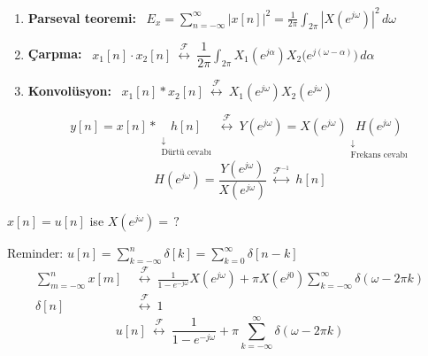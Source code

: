 \documentclass[11pt,a4paper]{article}
\begin{document}
\begin{enumerate}[label=\arabic*)]
  \item \textbf{Parseval teoremi:} \ $E_x=\displaystyle\sum_{n=-\infty}^{\infty}|x[n]|^2=\frac{1}{2\pi}\int_{2\pi}|X(e^{j\omega})|^2\,d\omega$
  \item \textbf{Çarpma:} \ $x_1[n]\cdot x_2[n]\ \overset{\mathcal{F}}{\longleftrightarrow}\ \dfrac{1}{2\pi}\displaystyle\int_{2\pi}X_1(e^{j\alpha})X_2\bigl(e^{j(\omega-\alpha)}\bigr)\,d\alpha$
  \item \textbf{Konvolüsyon:} \ $x_1[n]*x_2[n]\ \overset{\mathcal{F}}{\longleftrightarrow}\ X_1(e^{j\omega})X_2(e^{j\omega})$
    \begin{center}
    \end{center}
    \[
      y[n]=x[n]*\underset{\substack{\downarrow\\ \text{Dürtü cevabı}}}{h[n]}
      \ \overset{\mathcal{F}}{\longleftrightarrow}\
      Y(e^{j\omega})=X(e^{j\omega})\underset{\substack{\downarrow\\ \text{Frekans cevabı}}}{H(e^{j\omega})}
    \]
    \[
      H(e^{j\omega})=\frac{Y(e^{j\omega})}{X(e^{j\omega})}\ \overset{\mathcal{F}^{-1}}{\longleftrightarrow}\ h[n]
    \]
\end{enumerate}

\begin{ornek}[]
  $x[n]=u[n]$ ise $X(e^{j\omega})=\,?$
\end{ornek}
Reminder: \quad $u[n]=\displaystyle\sum_{k=-\infty}^{n}\delta[k]=\sum_{k=0}^{\infty}\delta[n-k]$
\begin{align*}
  \sum_{m=-\infty}^{n}x[m]\ &\overset{\mathcal{F}}{\longleftrightarrow}\ \frac{1}{1-e^{-j\omega}}X(e^{j\omega})+\pi X(e^{j0})\sum_{k=-\infty}^{\infty}\delta(\omega-2\pi k)\\
  \delta[n]\ &\overset{\mathcal{F}}{\longleftrightarrow}\ 1
\end{align*}
\[
  u[n]\ \overset{\mathcal{F}}{\longleftrightarrow}\ \frac{1}{1-e^{-j\omega}}+\pi\sum_{k=-\infty}^{\infty}\delta(\omega-2\pi k)
\]
\end{document}
